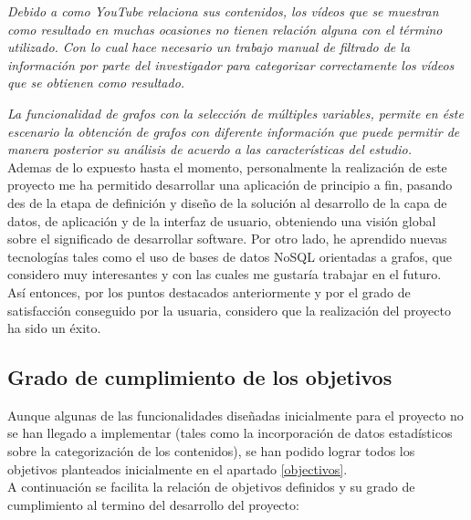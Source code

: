 \documentclass[11pt,a4paper]{article}
\begin{document}
\textit{Debido a como YouTube relaciona sus contenidos, los vídeos que se muestran como resultado en muchas ocasiones no tienen relación alguna con el término utilizado. Con lo cual hace necesario un trabajo manual de filtrado de la información por parte del investigador para categorizar correctamente los vídeos que se obtienen como resultado.}

\textit{La funcionalidad de grafos con la selección de múltiples variables, permite en éste escenario la obtención de grafos con diferente información que puede permitir de manera posterior su análisis de acuerdo a las características del estudio.}
\\

Ademas de lo expuesto hasta el momento, personalmente la realización de este proyecto me ha permitido desarrollar una aplicación de principio a fin, pasando des de la etapa de definición y diseño de la solución al desarrollo de la capa de datos, de aplicación y de la interfaz de usuario, obteniendo una visión global sobre el significado de desarrollar software. Por otro lado, he aprendido nuevas tecnologías tales como el uso de bases de datos NoSQL orientadas a grafos, que considero muy interesantes y con las cuales me gustaría trabajar en el futuro.
\\

Así entonces, por los puntos destacados anteriormente y por el grado de satisfacción conseguido por la usuaria, considero que la realización del proyecto ha sido un éxito.
\medskip 

\subsection{Grado de cumplimiento de los objetivos}
Aunque algunas de las funcionalidades diseñadas inicialmente para el proyecto no se han llegado a implementar (tales como la incorporación de datos estadísticos sobre la categorización de los contenidos), se han podido lograr todos los objetivos planteados inicialmente en el apartado \ref{objectivos}.
\\

A continuación se facilita la relación de objetivos definidos y su grado de cumplimiento al termino del desarrollo del proyecto:
\end{document}
